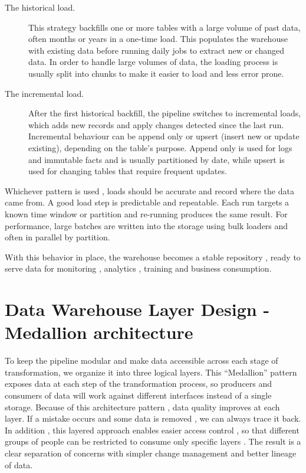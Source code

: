 \begin{description}
  \item[The historical load.] This strategy backfills one or more tables with a large volume of past data, often months or years in a one-time load. This populates the warehouse with existing data before running daily jobs to extract new or changed data. In order to handle large volumes of data, the loading process is usually split into chunks to make it easier to load and less error prone. \cite{kimball:2004}

  \item[The incremental load.] After the first historical backfill, the pipeline switches to incremental loads, which adds new records and apply changes detected since the last run. Incremental behaviour can be append only or upsert (insert new or update existing), depending on the table's purpose. Append only is used for logs and immutable facts and is usually partitioned by date, while upsert is used for changing tables that require frequent updates. \cite{kamat:2022}
\end{description}

Whichever pattern is used , loads should be accurate and record where the data came from. A good load step is predictable and repeatable. Each run targets a known time window or partition and re-running produces the same result. For performance, large batches are written into the storage using bulk loaders and often in parallel by partition. \cite{kimball:2004}

With this behavior in place, the warehouse becomes a stable repository , ready to serve data for monitoring , analytics , training and business consumption.





\section{Data Warehouse Layer Design - Medallion architecture}
To keep the pipeline modular and make data accessible across each stage of transformation, we organize it into three logical layers. This “Medallion” pattern exposes data at each step of the transformation process, so producers and consumers of data will work against different interfaces instead of a single storage. Because of this architecture pattern , data quality improves at each layer. If a mistake occurs and some data is removed , we can always trace it back. In addition , this layered approach enables easier access control , so that different groups of people can be restricted to consume only specific layers \cite{wiselka:2024}. The result is a clear separation of concerns with simpler change management and better lineage of data.

